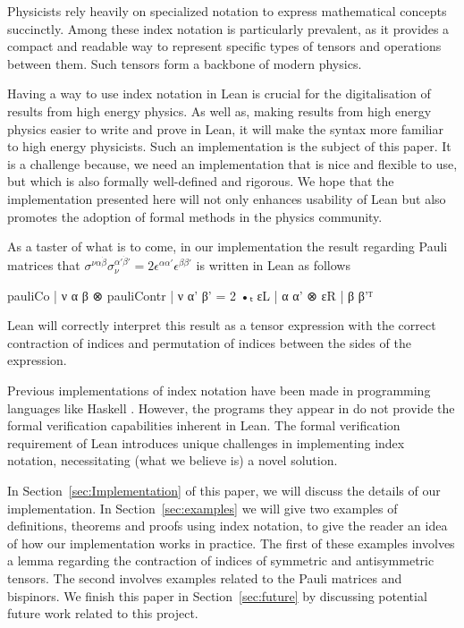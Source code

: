 \documentclass[a4paper, 11pt]{article}
\begin{document}
Physicists rely heavily on specialized notation to express mathematical concepts succinctly. 
Among these index notation is particularly prevalent,
 as it provides a compact and readable way to represent specific types of tensors and operations
 between them. Such tensors form a backbone of modern physics. 

Having a way to use index notation in Lean is crucial for the digitalisation of 
results from high energy physics. 
As well as, making results from high energy physics easier to write and prove in Lean, 
it will make the syntax more familiar to high energy physicists. 
Such an implementation is the subject of this paper. 
It is a challenge because, we need an implementation that is nice and flexible to use, 
but which is also formally well-defined and rigorous. 
We hope that the implementation presented here will
not only enhances usability of Lean but also promotes the adoption of formal methods in the 
physics community.

As a taster of what is to come, in our implementation the result regarding Pauli matrices 
that $\sigma^{\nu \alpha \dot \beta}\sigma_\nu^{ \alpha' \dot \beta'} = 2 \epsilon^{\alpha \alpha'}\epsilon^{\beta \beta'}$ 
is written in Lean as follows
\begin{code}
{pauliCo | ν α β ⊗ pauliContr | ν α' β' = 2 •ₜ εL | α α' ⊗ εR | β β'}ᵀ
\end{code}
Lean will correctly interpret this result as a tensor expression with the correct contraction of indices 
and permutation of indices between the sides of the expression.

Previous implementations of index notation have been made in programming languages like Haskell 
\cite{haskellPaper}. However, the programs they appear in do not
 provide the formal verification capabilities inherent in Lean. 
 The formal verification requirement of Lean introduces unique challenges in implementing index 
 notation, necessitating (what we believe is) a novel solution.

In Section~\ref{sec:Implementation} of this paper, we will discuss the details of our implementation. 
In Section~\ref{sec:examples} we will give two examples of definitions, theorems and proofs using index notation, 
to give the reader an idea of how our implementation works in practice.
The first of these examples involves a lemma regarding the contraction of indices of symmetric and antisymmetric tensors. 
The second involves examples related to the Pauli matrices and bispinors. 
We finish this paper in Section~\ref{sec:future} by discussing potential future work related to this project.
\end{document}
